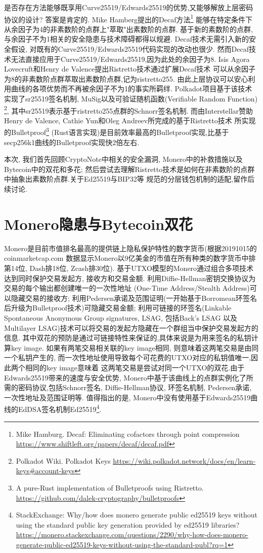 \documentclass{article}
\begin{document}
是否存在方法能够既享用Curve25519/Edwards25519的优势,又能够解放上层密码协议的设计?
答案是肯定的. Mike Hamberg提出的Decaf方法\footnote{
Mike Hamburg. Decaf: Eliminating cofactors through point compression
\url{https://www.shiftleft.org/papers/decaf/decaf.pdf}}
能够在特定条件下从余因子为4的非素数阶的点群上"萃取"出素数阶的点群.
基于新的素数阶的点群,与余因子不为1相关的安全隐患与技术障碍都得以规避.
Decaf技术无需引入新的安全假设, 对既有的Curve25519/Edwards25519代码实现的改动也很少.
然而Decaf技术无法直接应用于Curve25519/Edwards25519,因为此处的余因子为8.
Isis Agora Lovecruft和Henry de Valence提出Ristretto技术通过扩展Decaf技术
可以从余因子为8的非素数阶点群萃取出素数阶点群,记为ristretto255.
由此上层协议可以安心利用曲线的各项优势而不再被余因子不为1的事实所羁绊.
Polkadot项目基于该技术实现了sr25519签名机制, MuSig以及可验证随机函数(Verifiable Random Function)
\footnote{Polkadot Wiki. Polkadot Keys
\url{https://wiki.polkadot.network/docs/en/learn-keys\#account-keys}}, 
其中sr25519表示基于ristretto255点群的Schnorr签名机制.
而由Interstellar赞助Henry de Valence, Cathie Yun和Oleg Andreev所完成的基于Ristretto技术
所实现的Bulletproof\footnote{A pure-Rust implementation of Bulletproofs using Ristretto.
\url{https://github.com/dalek-cryptography/bulletproofs}}
(Rust语言实现)是目前效率最高的Bulletproof实现,比基于secp256k1曲线的Bulletproof实现快2倍左右.

本次, 我们首先回顾CryptoNote中相关的安全漏洞, Monero中的补救措施以及Bytecoin中的双花和多花;
然后尝试去理解Ristretto技术是如何在非素数阶的点群中抽象出素数阶点群.关于Ed25519与BIP32等
规范的分层钱包机制的适配,留作后续讨论.

\section{Monero隐患与Bytecoin双花}

Monero是目前市值排名最高的提供链上隐私保护特性的数字货币(根据20191015的coinmarketcap.com
数据显示Monero以9亿美金的市值在所有种类的数字货币中排第14位, Dash排18位, Zcash排30位).
基于UTXO模型的Monero通过组合多项技术达到同时保护交易发起方, 接收方和交易金额. 
利用Diffie-Hellman密钥交换协议为交易的每个输出都创建唯一的一次性地址
(One-Time Address/Stealth Address)可以隐藏交易的接收方; 
利用Pedersen承诺及范围证明(一开始基于Borromean环签名后升级为Bulletproof技术)可隐藏交易金额;
利用可链接的环签名(Linkable Spontaneous Anonymous Group signatures, LSAG, 包括Back's LSAG
以及Multilayer LSAG)技术可以将交易的发起方隐藏在一个群组当中保护交易发起方的信息.
其中双花的预防是通过可链接特性来保证的,具体来说是为用来签名的私钥计算key image.
如果有两笔交易相关联的key image相同, 则意味着这两笔交易是由同一个私钥产生的,
而一次性地址使用导致每个可花费的UTXO对应的私钥值唯一,因此两个相同的key image意味着
这两笔交易是尝试对同一个UTXO的双花.由于Edwards25519带来的速度与安全优势, 
Monero中基于该曲线上的点群实例化了所需的密码协议,包括Schnorr签名, Diffie-Hellman协议,
环签名机制, Pedersen承诺, 一次性地址及范围证明等.
值得指出的是, Monero中没有使用基于Edwards25519曲线的EdDSA签名机制Ed25519\footnote{
StackExchange: Why/how does monero generate public ed25519 keys without using the standard public key generation provided by ed25519 libraries?
\url{https://monero.stackexchange.com/questions/2290/why-how-does-monero-generate-public-ed25519-keys-without-using-the-standard-publ?rq=1}}.
\end{document}
